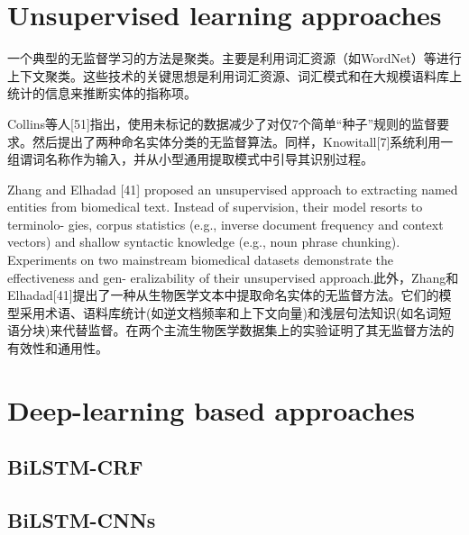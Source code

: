 \documentclass[a4paper,UTF8,no-math]{ctexart}
\begin{document}
	
	
	\section{Unsupervised learning approaches}
	
	一个典型的无监督学习的方法是聚类。主要是利用词汇资源（如WordNet）等进行上下文聚类。这些技术的关键思想是利用词汇资源、词汇模式和在大规模语料库上统计的信息来推断实体的指称项。
	
	Collins等人[51]指出，使用未标记的数据减少了对仅7个简单“种子”规则的监督要求。然后提出了两种命名实体分类的无监督算法。同样，Knowitall[7]系统利用一组谓词名称作为输入，并从小型通用提取模式中引导其识别过程。 
	
	 Zhang and Elhadad [41] proposed an unsupervised
	approach to extracting named entities from biomedical text.
	Instead of supervision, their model resorts to terminolo-
	gies, corpus statistics (e.g., inverse document frequency
	and context vectors) and shallow syntactic knowledge (e.g.,
	noun phrase chunking). Experiments on two mainstream
	biomedical datasets demonstrate the effectiveness and gen-
	eralizability of their unsupervised approach.此外，Zhang和Elhadad[41]提出了一种从生物医学文本中提取命名实体的无监督方法。它们的模型采用术语、语料库统计(如逆文档频率和上下文向量)和浅层句法知识(如名词短语分块)来代替监督。在两个主流生物医学数据集上的实验证明了其无监督方法的有效性和通用性。 
	
	
	
	
	
	
	
	
	\section{Deep-learning based approaches}
	
	\subsection{BiLSTM-CRF}
	\subsection{BiLSTM-CNNs}

    
\end{document}
